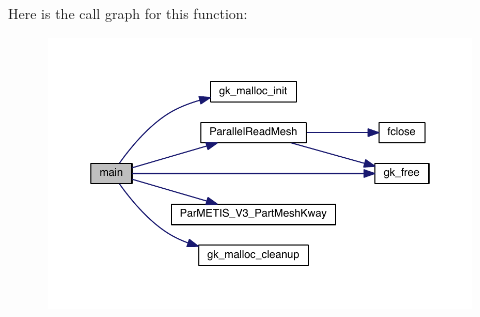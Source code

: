 Here is the call graph for this function\+:\nopagebreak
\begin{figure}[H]
\begin{center}
\leavevmode
\includegraphics[width=350pt]{a00425_a0ddf1224851353fc92bfbff6f499fa97_cgraph}
\end{center}
\end{figure}
